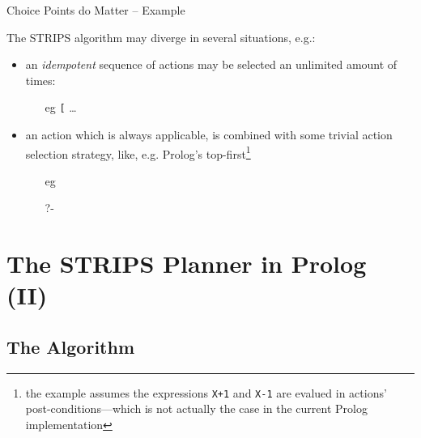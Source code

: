 \documentclass[presentation]{beamer}\mode<presentation>{\usetheme{AMSBolognaFC}}
\begin{document}
\begin{frame}[c]{Choice Points do Matter -- Example}

The STRIPS algorithm may diverge in several situations, e.g.:
%
\vfill
%
\begin{itemize}
    \item an \alert{\emph{idempotent}} sequence of actions may be selected an unlimited amount of times:
    \begin{itemize}
        \item[eg] \texttt{[} \ldots
    \end{itemize}

    \vfill

    \item an action which is always applicable, is combined with some trivial action selection strategy, like, e.g. Prolog's top-first\footnote{the example assumes the expressions \texttt{X+1} and \texttt{X-1} are \alert{evalued} in actions' post-conditions---which is not actually the case in the current Prolog implementation}
    \begin{itemize}\scriptsize
        \item[eg] 
        \\

        \item[]

        \item[?-] 
    \end{itemize}
\end{itemize}

\end{frame}


\section{The STRIPS Planner in Prolog (II)}

\subsection{The Algorithm}
\end{document}
